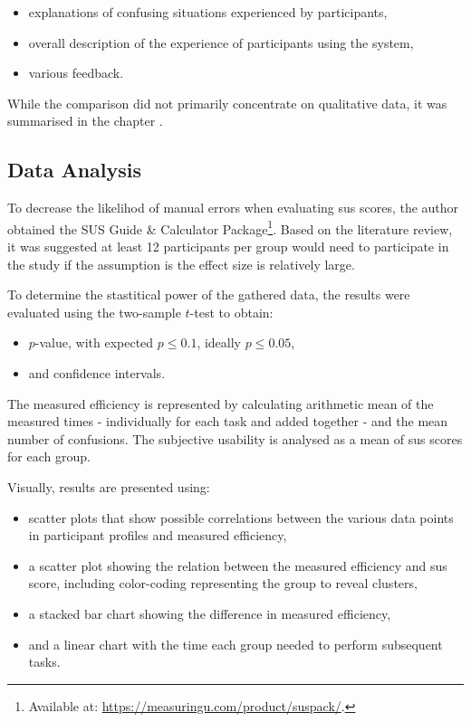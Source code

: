 \begin{itemize}
    \item explanations of confusing situations experienced by participants,
    \item overall description of the experience of participants using the system,
    \item various feedback.
\end{itemize}

While the comparison did not primarily concentrate on qualitative data, it was summarised in the chapter .

\subsection{Data Analysis}

To decrease the likelihod of manual errors when evaluating \gls{sus} scores, the author obtained the SUS Guide \& Calculator Package\footnote{Available at: \url{https://measuringu.com/product/suspack/}.}.
Based on the  literature review, it was suggested at least 12 participants per group would need to participate in the study if the assumption is the effect size is relatively large.

To determine the stastitical power of the gathered data, the results were evaluated using the two-sample $t$-test to obtain:

\begin{itemize}
    \item $p$-value, with expected $p \leq 0.1 $, ideally $p \leq 0.05 $,
    \item and confidence intervals.
\end{itemize}

The measured efficiency is represented by calculating arithmetic mean of the measured times - individually for each task and added together - and the mean number of confusions.
The subjective usability is analysed as a mean of \gls{sus} scores for each group.

Visually, results are presented using:

\begin{itemize}
    \item scatter plots that show possible correlations between the various data points in participant profiles and measured efficiency,
    \item a scatter plot showing the relation between the measured efficiency and \gls{sus} score, including color-coding representing the group to reveal clusters,
    \item a stacked bar chart showing the difference in measured efficiency,
    \item and a linear chart with the time each group needed to perform subsequent tasks.
\end{itemize}
